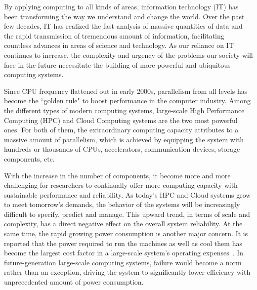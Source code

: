 By applying computing to all kinds of areas, information technology (IT) has been transforming the way we 
understand and change the world. Over the past few decades, IT has realized the fast analysis of massive 
quantities of data and the rapid transmission of tremendous amount of information, facilitating 
countless advances in areas of science and technology. 
As our reliance on IT continues to increase, the complexity and urgency of the problems our society will face 
in the future necessitate the building of more powerful and ubiquitous computing systems. 

Since CPU frequency flattened out in early 2000s, parallelism from all levels has become the ``golden rule" to boost performance 
in the computer industry. Among the different types of modern computing systems, large-scale High Performance 
Computing (HPC) and Cloud Computing systems are the two most powerful ones. 
For both of them, the extraordinary computing capacity attributes to a massive amount of parallelism, which is achieved by 
equipping the system with hundreds or thousands of CPUs, accelerators, communication devices, storage components, etc. 


With the increase in the number of components, it become more and more challenging for 
researchers to continually offer more computing capacity with sustainable performance and reliability. 
As today's HPC and Cloud systems grow to 
meet tomorrow's demands, the behavior of the systems will be increasingly difficult to specify, predict and manage. 
This upward trend, in terms of scale and complexity, has a direct negative effect on the overall system reliability. 
At the same time, the rapid growing power consumption is another major concern. 
It is reported that 
the power required to run the machines as well as cool them has become the largest cost factor in a large-scale system's operating 
expenses~\cite{scaramella2014worldwide}.  
In future-generation large-scale computing systems, failure would become a norm rather than an exception, 
driving the system to significantly lower efficiency with unprecedented amount of power consumption. 

